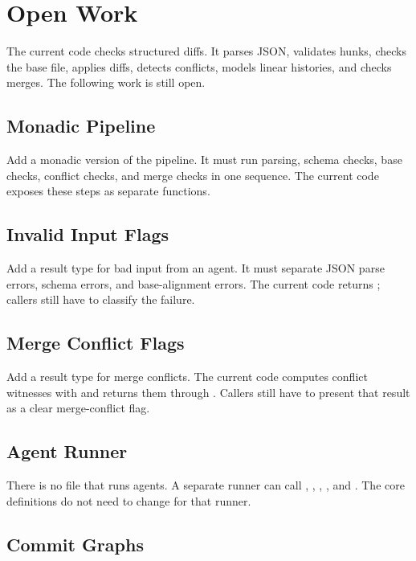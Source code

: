 \section{Open Work}

The current code checks structured diffs. It parses JSON, validates hunks,
checks the base file, applies diffs, detects conflicts, models linear histories,
and checks merges. The following work is still open.

\subsection{Monadic Pipeline}

Add a monadic version of the pipeline. It must run parsing, schema checks, base
checks, conflict checks, and merge checks in one sequence. The current code
exposes these steps as separate functions.

\subsection{Invalid Input Flags}

Add a result type for bad input from an agent. It must separate JSON parse
errors, schema errors, and base-alignment errors. The current code returns
; callers still have to classify the failure.

\subsection{Merge Conflict Flags}

Add a result type for merge conflicts. The current code computes conflict
witnesses with  and returns them through
. Callers still have to present that result as a
clear merge-conflict flag.

\subsection{Agent Runner}

There is no file that runs agents. A separate runner can call
, , ,
, and . The core definitions do not need
to change for that runner.

\subsection{Commit Graphs}

